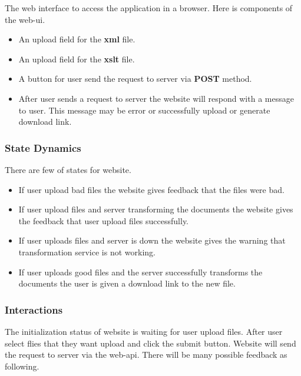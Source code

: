 The web interface to access the application in a browser.
Here is components of the \gls{web-ui}.

\begin{itemize}
    \item An upload field for the \textbf{\gls{xml}} file.
    \item An upload field for the \textbf{\gls{xslt}} file.
    \item A button for user send the request to server via \textbf{POST} method.
    \item {
   		After user sends a request to server the website will respond with a message to user.
        This message may be error or successfully upload or generate download link.
    }
\end{itemize}

\subsubsection{State Dynamics}

There are few of states for website.

\begin{itemize}
    \item If user upload bad files the website gives feedback that the files were bad.
    \item If user upload files and server transforming the documents the website gives the feedback that user upload files successfully.
    \item If user uploads files and server is down the website gives the warning that transformation service is not working.
    \item If user uploads good files and the server successfully transforms the documents the user is given a download link to the new file.
\end{itemize}

\subsubsection{Interactions}

The initialization status of website is waiting for user upload files.
After user select flies that they want upload and click the submit button.
Website will send the request to server via the \gls{web-api}.
There will be many possible feedback as following.

